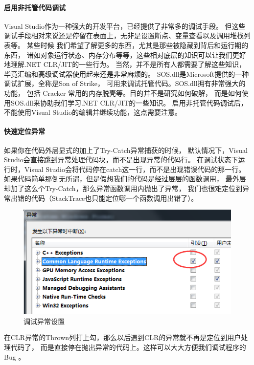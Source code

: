 \documentclass{book}
\begin{document}
\paragraph{启用非托管代码调试}Visual Studio作为一种强大的开发平台，已经提供了非常多的调试手段。
但这些调试手段相对来说还是停留在表面上，无非是设置断点、变量查看以及调用堆栈列表等。
某些时候 我们希望了解更多的东西，尤其是那些被隐藏到背后和运行期的东西，
诸如对象运行状态、内存分布等等，这些相对底层的知识可以让我们更好地理解.NET CLR/JIT的一些行为。
当然，并不是所有人都需要了解这些知识，毕竟汇编和高级调试器使用起来还是非常麻烦的。
SOS.dll是Microsoft提供的一种调试扩展，全称是Son of Strike，
可用来调试托管代码。SOS.dll拥有非常强大的功能，
包括 Cracker 常用的内存脱壳等。目的并不是研究如何破解，
而是如何使用SOS.dll来协助我们学习.NET CLR/JIT的一些知识。
启用非托管代码调试后，不能使用Visual Studio的编辑并继续功能，这点需要注意。

\paragraph{快速定位异常}如果你在代码外层显式的加上了Try-Catch异常捕获的时候，
默认情况下，Visual Studio会直接跳到异常处理代码块，而不是出现异常的代码行。
在调试状态下运行时，Visual Studio会将代码停在catch这一行，而不是出现错误代码的那一行。
如果代码简单那倒无所谓，但是假想我们的代码是经过层层的函数调用，
最外层却加了这么个Try-Catch，那么异常函数调用内抛出了异常，
我们也很难定位到异常出错的代码（StackTrace也只能定位哪一个函数调用出错了）。

\begin{figure}[htbp]
	\centering
	\includegraphics[scale=0.8]{DebugExceptionThrowSetting.png}
	\caption{调试异常设置}
	\label{fig:DebugExceptionThrowSetting}
\end{figure}

在CLR异常的Thrown列打上勾，那么以后遇到CLR的异常就不再是定位到用户处理代码了，
而是直接停在抛出异常的代码上。这样可以大大方便我们调试程序的Bug 。
\end{document}
